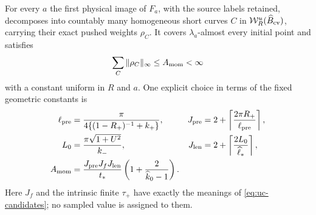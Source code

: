 \begin{lemma}
\label{lem:mc-family}
For every $a$ the first physical image of $F_a$, with the source labels
retained, decomposes into countably many homogeneous short curves $C$ in
$\mathcal W_R^u(\widehat B_{\rm cv})$, carrying their exact pushed
weights $\rho_C$. It covers $\lambda_a$-almost every initial point and
satisfies
\begin{equation}\label{eq:mc-family}
 \sum_C\|\rho_C\|_\infty\le A_{\rm mom}<\infty
\end{equation}
with a constant uniform in $R$ and $a$.
One explicit choice in terms of the fixed geometric constants is
\begin{align}
 \ell_{\rm pre}
   &=\frac{\pi}{4\{(1-R_+)^{-1}+k_+\}},&
 J_{\rm pre}&=2+\left\lceil\frac{2\pi R_+}{\ell_{\rm pre}}\right\rceil,
                                                        \label{eq:mc-pre}\\
 L_0&=\frac{\pi\sqrt{1+U^2}}{k_-},&
 J_{\rm len}&=2+\left\lceil\frac{2L_0}{\widehat\ell_*}\right\rceil,
                                                        \label{eq:mc-length}\\
 A_{\rm mom}
   &=\frac{J_{\rm pre}J_fJ_{\rm len}}{t_*}
                      \left(1+\frac2{\widehat k_0-1}\right).
                                                        \label{eq:mc-A}
\end{align}
Here $J_f$ and the intrinsic finite $\tau_+$ have exactly the meanings
of \eqref{eq:uc-candidates}; no sampled value is assigned to them.
\end{lemma}
